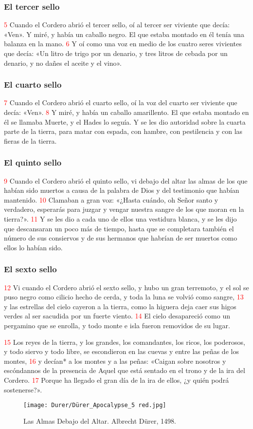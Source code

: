 \documentclass[12pt,twocolumn,twoside]{book}
\newcommand{\vnum}[1]{\textcolor{red}{\normalsize{#1}}}
\begin{document}
\subsubsection*{El tercer sello}
\vnum{5} Cuando el Cordero abrió el tercer sello, oí al tercer ser viviente que decía: «Ven». Y miré, y había un caballo negro. El que estaba montado en él tenía una balanza en la mano. \vnum{6} Y oí como una voz en medio de los cuatro seres vivientes que decía: «Un litro de trigo por un denario, y tres litros de cebada por un denario, y no dañes el aceite y el vino».
\subsubsection*{El cuarto sello}
\vnum{7} Cuando el Cordero abrió el cuarto sello, oí la voz del cuarto ser viviente que decía: «Ven». \vnum{8} Y miré, y había un caballo amarillento. El que estaba montado en él se llamaba Muerte, y el Hades lo seguía. Y se les dio autoridad sobre la cuarta parte de la tierra, para matar con espada, con hambre, con pestilencia y con las fieras de la tierra.
\subsubsection*{El quinto sello}
\vnum{9} Cuando el Cordero abrió el quinto sello, vi debajo del altar las almas de los que habían sido muertos a causa de la palabra de Dios y del testimonio que habían mantenido. \vnum{10} Clamaban a gran voz: «¿Hasta cuándo, oh Señor santo y verdadero, esperarás para juzgar y vengar nuestra sangre de los que moran en la tierra?». \vnum{11} Y se les dio a cada uno de ellos una vestidura blanca, y se les dijo que descansaran un poco más de tiempo, hasta que se completara también el número de sus consiervos y de sus hermanos que habrían de ser muertos como ellos lo habían sido.
\subsubsection*{El sexto sello}
\vnum{12} Vi cuando el Cordero abrió el sexto sello, y hubo un gran terremoto, y el sol se puso negro como cilicio hecho de cerda, y toda la luna se volvió como sangre, \vnum{13} y las estrellas del cielo cayeron a la tierra, como la higuera deja caer sus higos verdes al ser sacudida por un fuerte viento. \vnum{14} El cielo desapareció como un pergamino que se enrolla, y todo monte e isla fueron removidos de su lugar.

\vnum{15} Los reyes de la tierra, y los grandes, los comandantes, los ricos, los poderosos, y todo siervo y todo libre, se escondieron en las cuevas y entre las peñas de los montes, \vnum{16} y decían* a los montes y a las peñas: «Caigan sobre nosotros y escóndannos de la presencia de Aquel que está sentado en el trono y de la ira del Cordero. \vnum{17} Porque ha llegado el gran día de la ira de ellos, ¿y quién podrá sostenerse?».
\begin{figure*}[p!]
	\centering
       \texttt{[image: Durer/Dürer\_Apocalypse\_5 red.jpg]}    
    	\caption{Las Almas Debajo del Altar. Albrecht Dürer, 1498.}
\end{figure*}
\end{document}
